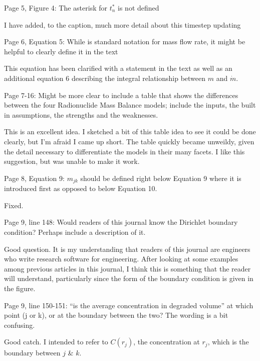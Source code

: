 \documentclass[answers,12pt]{exam}
\begin{document}
\begin{questions}
\question Page 5, Figure 4: The asterisk for $t^*_n$ is not defined 
\begin{solution}
I have added, to the caption, much more detail about this timestep updating 
\end{solution} 


\question Page  6,  Equation  5: While   is standard notation for mass flow rate, it might be helpful to clearly define 
it in the text 
\begin{solution}
This equation has been clarified with a statement in the text as well as an 
        additional equation 6 describing the integral relationship between $m$ 
        and $\dot{m}$.
\end{solution} 
 
\question Page  7-16:  Might  be  more  clear  to  include  a  table  that  shows  the  differences  between  the  four 
Radionuclide  Mass  Balance  models;  include  the  inputs,  the  built  in  assumptions,  the  strengths  and  the 
weaknesses. 
\begin{solution}
This is an excellent idea. I sketched a bit of this table idea to see it could be 
        done clearly, but I'm afraid I came up short. The table quickly became 
        unweildy, given the detail necessary to differentiate the models in 
        their many facets. I like this suggestion, but was unable to make it 
        work.
\end{solution} 
 
\question Page  8,  Equation  9:  $m_{jk}$  should be defined right below Equation 9 where it is introduced first as opposed 
to below Equation 10. 
\begin{solution}
Fixed.
\end{solution} 
 
\question Page  9, line 148: Would readers of this journal know the Dirichlet boundary condition? Perhaps include a 
description of it. 
\begin{solution}
Good question. It is my understanding that readers of this journal are 
        engineers who write research software for engineering. After looking at 
        some examples among previous articles in this journal, I think this is 
        something that the reader will understand, 
        particularly since the form of the boundary condition is given in the 
        figure.
\end{solution} 
 
\question Page  9,  line  150-151:  ``is  the  average  concentration in degraded volume'' at which point (j or k), or at the 
boundary between the two? The wording is a bit confusing.  
\begin{solution}
        Good catch. I intended to refer to $C(r_j)$, the concentration at 
        $r_j$, which is the boundary between $j$ \& $k$.
\end{solution} 
 

\end{questions}
\end{document}
